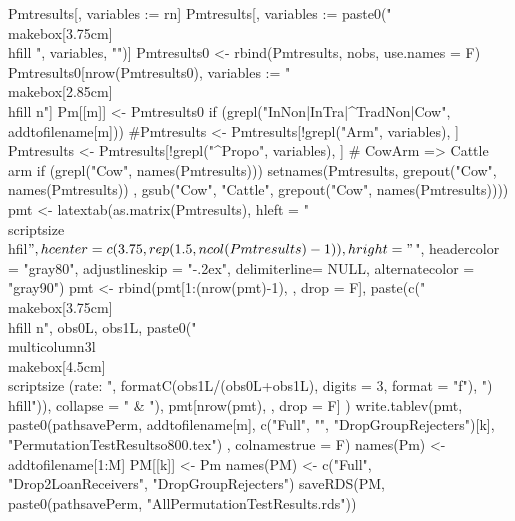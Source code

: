 \begin{Schunk}
\begin{Sinput}
{{    Pmtresults[, variables := rn]
    Pmtresults[, variables := paste0("\\makebox[3.75cm]{\\hfill ", variables, "}")]
    Pmtresults0 <- rbind(Pmtresults, nobs, use.names = F)
    Pmtresults0[nrow(Pmtresults0), variables := "\\makebox[2.85cm]{\\hfill n}"]
    Pm[[m]] <- Pmtresults0
    if (grepl("InNon|InTra|^TradNon|Cow", addtofilename[m]))
      #Pmtresults <- Pmtresults[!grepl("Arm", variables), ]
      Pmtresults <- Pmtresults[!grepl("^Propo", variables), ]
    # CowArm => Cattle arm
    if (grepl("Cow", names(Pmtresults))) {
      setnames(Pmtresults, 
        grepout("Cow", names(Pmtresults))
        , gsub("Cow", "Cattle", grepout("Cow", names(Pmtresults))))
    }
    pmt <- latextab(as.matrix(Pmtresults), 
      hleft = "\\scriptsize\\hfil$", 
      hcenter = c(3.75, rep(1.5, ncol(Pmtresults)-1)), 
      hright = "$", 
      headercolor = "gray80", adjustlineskip = "-.2ex", delimiterline= NULL,
      alternatecolor = "gray90")
    pmt <- rbind(pmt[1:(nrow(pmt)-1), , drop = F], 
        paste(c("\\makebox[3.75cm]{\\hfill n}", 
         obs0L, obs1L, paste0("\\multicolumn{3}{l}{\\makebox[4.5cm]{\\scriptsize (rate: ", 
         formatC(obs1L/(obs0L+obs1L), digits = 3, format = "f"), ")\\hfill}}")), 
         collapse = " & "),
        pmt[nrow(pmt), , drop = F] 
      )
    write.tablev(pmt,  
      paste0(pathsavePerm, addtofilename[m], 
        c("Full", "", "DropGroupRejecters")[k], "PermutationTestResultso800.tex")
    , colnamestrue = F)
  }
  names(Pm) <- addtofilename[1:M]
  PM[[k]] <- Pm
}
names(PM) <- c("Full", "Drop2LoanReceivers", "DropGroupRejecters")
saveRDS(PM, paste0(pathsavePerm, "AllPermutationTestResults.rds"))
\end{Sinput}
\end{Schunk}
